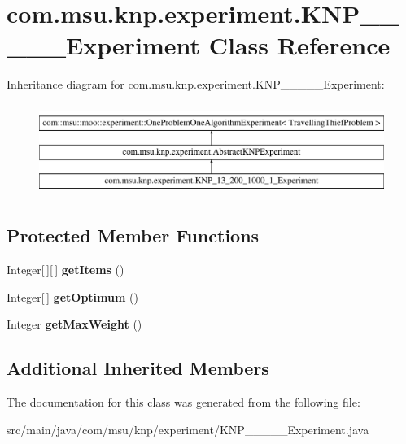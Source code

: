 \hypertarget{classcom_1_1msu_1_1knp_1_1experiment_1_1KNP__13__200__1000__1__Experiment}{\section{com.\-msu.\-knp.\-experiment.\-K\-N\-P\-\_\-\_\-\_\-\_\-\_\-\-Experiment Class Reference}
\label{classcom_1_1msu_1_1knp_1_1experiment_1_1KNP__13__200__1000__1__Experiment}
}
Inheritance diagram for com.\-msu.\-knp.\-experiment.\-K\-N\-P\-\_\-\_\-\_\-\_\-\_\-\-Experiment\-:\begin{figure}[H]
\begin{center}
\leavevmode
\includegraphics[height=3.000000cm]{classcom_1_1msu_1_1knp_1_1experiment_1_1KNP__13__200__1000__1__Experiment}
\end{center}
\end{figure}
\subsection*{Protected Member Functions}
\begin{DoxyCompactItemize}
\item 
\hypertarget{classcom_1_1msu_1_1knp_1_1experiment_1_1KNP__13__200__1000__1__Experiment_a3ba9746feacd9e4146f6043fb69bf9de}{Integer\mbox{[}$\,$\mbox{]}\mbox{[}$\,$\mbox{]} {\bfseries get\-Items} ()}\label{classcom_1_1msu_1_1knp_1_1experiment_1_1KNP__13__200__1000__1__Experiment_a3ba9746feacd9e4146f6043fb69bf9de}

\item 
\hypertarget{classcom_1_1msu_1_1knp_1_1experiment_1_1KNP__13__200__1000__1__Experiment_a29e2e186e96914ec9ca63b65d13b65bd}{Integer\mbox{[}$\,$\mbox{]} {\bfseries get\-Optimum} ()}\label{classcom_1_1msu_1_1knp_1_1experiment_1_1KNP__13__200__1000__1__Experiment_a29e2e186e96914ec9ca63b65d13b65bd}

\item 
\hypertarget{classcom_1_1msu_1_1knp_1_1experiment_1_1KNP__13__200__1000__1__Experiment_af89e35b989f854ee3f6798c3d69c4209}{Integer {\bfseries get\-Max\-Weight} ()}\label{classcom_1_1msu_1_1knp_1_1experiment_1_1KNP__13__200__1000__1__Experiment_af89e35b989f854ee3f6798c3d69c4209}

\end{DoxyCompactItemize}
\subsection*{Additional Inherited Members}


The documentation for this class was generated from the following file\-:\begin{DoxyCompactItemize}
\item 
src/main/java/com/msu/knp/experiment/K\-N\-P\-\_\-\_\-\_\-\_\-\_\-\-Experiment.\-java\end{DoxyCompactItemize}
